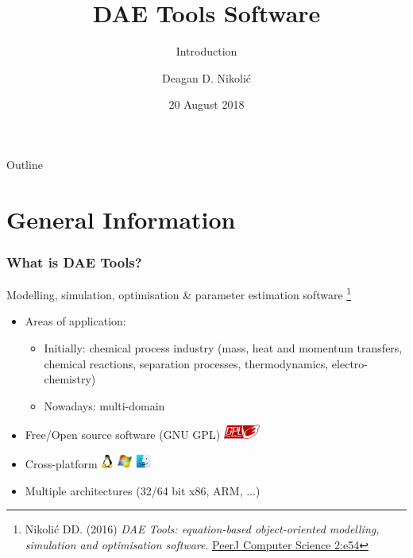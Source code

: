 \documentclass[compress,newPxFont,sthlmFooter]{beamer}
\title{DAE Tools Software}
\subtitle{Introduction}
\author{Deagan D. Nikolić}
\institute
{
  DAE Tools Project, \url{http://www.daetools.com}
}
\date{20 August 2018}
\begin{document}
\maketitle

\begin{frame}{Outline}
\tableofcontents[sectionstyle=show, 
                 subsectionstyle=hide]
\end{frame} 

\section{General Information}

\begin{frame}
\frametitle{What is DAE Tools?} 
\alert{Modelling}, \alert{simulation}, \alert{optimisation} \& \alert{parameter estimation} software
\footnote{\tiny{Nikolić DD. (2016) \textit{DAE Tools: equation-based object-oriented modelling, simulation and optimisation software}.
          \href{https://doi.org/10.7717/peerj-cs.54}{PeerJ Computer Science 2:e54}}
         }

\begin{itemize}
  \item Areas of application:
    \begin{itemize}
      \item Initially: \alert{chemical process industry} (mass, heat and momentum transfers, chemical reactions, 
                                                          separation processes, thermodynamics, electro-chemistry)
      \item Nowadays: \alert{multi-domain}
    \end{itemize}
  \item \alert{Free/Open source software} (GNU GPL) \includegraphics[align=c,height=1.3em]{gnu_gpl3.png}
  \item \alert{Cross-platform} \includegraphics[align=c,height=1.3em]{linux.png} 
                               \includegraphics[align=c,height=1.3em]{windows.png} 
                               \includegraphics[align=c,height=1.3em]{macos.png}
  \item \alert{Multiple architectures} (32/64 bit x86, ARM, ...)
\end{itemize}
\end{frame}
\end{document}
